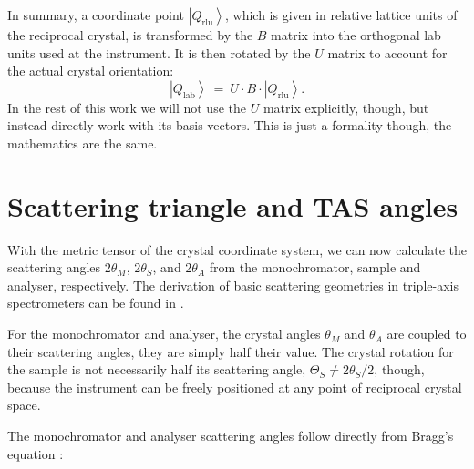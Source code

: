 In summary, a coordinate point $\left|Q_{\mathrm{rlu}}\right>$, which is given in relative lattice units of the reciprocal crystal, 
is transformed by the $B$ matrix into the orthogonal lab units used at the instrument. 
It is then rotated by the $U$ matrix to account for the actual crystal orientation:
\begin{equation}
	\left|Q_{\mathrm{lab}}\right> \ =\  U \cdot B \cdot \left|Q_{\mathrm{rlu}}\right>.
\end{equation}
In the rest of this work we will not use the $U$ matrix explicitly, though, but instead directly work with its basis vectors.
This is just a formality though, the mathematics are the same.





\section{Scattering triangle and TAS angles \label{sec:tasangles}}

With the metric tensor of the crystal coordinate system, we can now calculate the scattering angles $2 \theta_M$, $2 \theta_S$, and $2 \theta_A$ from the monochromator, sample and analyser, respectively. The derivation of basic scattering geometries in triple-axis spectrometers can be found in \cite[Ch. 1.3]{Shirane2002}.

For the monochromator and analyser, the crystal angles $\theta_M$ and $\theta_A$ are coupled to their scattering angles, they are simply half their value. 
The crystal rotation for the sample is not necessarily half its scattering angle, $\Theta_S \ne 2\theta_S/2$, though, because the instrument can be freely positioned at any point of reciprocal crystal space.

The monochromator and analyser scattering angles follow directly from Bragg's equation \cite[p. 68]{Gross2012} \cite[p. 13]{Shirane2002}:

